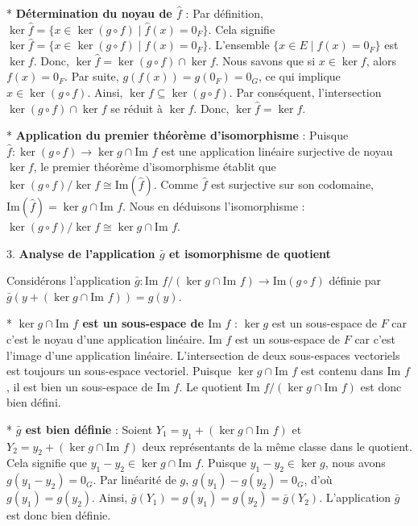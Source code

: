 \documentclass{report}
\begin{document}
    *   \textbf{Détermination du noyau de $\hat{f}$} :
        Par définition, $\ker \hat{f} = \{x \in \ker(g \circ f) \mid \hat{f}(x) = 0_F\}$.
        Cela signifie $\ker \hat{f} = \{x \in \ker(g \circ f) \mid f(x) = 0_F\}$.
        L'ensemble $\{x \in E \mid f(x) = 0_F\}$ est $\ker f$.
        Donc, $\ker \hat{f} = \ker(g \circ f) \cap \ker f$.
        Nous savons que si $x \in \ker f$, alors $f(x) = 0_F$. Par suite, $g(f(x)) = g(0_F) = 0_G$, ce qui implique $x \in \ker(g \circ f)$.
        Ainsi, $\ker f \subseteq \ker(g \circ f)$.
        Par conséquent, l'intersection $\ker(g \circ f) \cap \ker f$ se réduit à $\ker f$.
        Donc, $\ker \hat{f} = \ker f$.

    *   \textbf{Application du premier théorème d'isomorphisme} :
        Puisque $\hat{f}: \ker(g \circ f) \to \ker g \cap \text{Im } f$ est une application linéaire surjective de noyau $\ker f$, le premier théorème d'isomorphisme établit que
        $\ker(g \circ f) / \ker f \cong \text{Im}(\hat{f})$.
        Comme $\hat{f}$ est surjective sur son codomaine, $\text{Im}(\hat{f}) = \ker g \cap \text{Im } f$.
        Nous en déduisons l'isomorphisme : $\ker(g \circ f) / \ker f \cong \ker g \cap \text{Im } f$.

3.  \textbf{Analyse de l'application $\bar{g}$ et isomorphisme de quotient}

    Considérons l'application $\bar{g}: \text{Im } f / (\ker g \cap \text{Im } f) \to \text{Im}(g \circ f)$ définie par $\bar{g}(y + (\ker g \cap \text{Im } f)) = g(y)$.

    *   \textbf{$\ker g \cap \text{Im } f$ est un sous-espace de $\text{Im } f$} :
        $\ker g$ est un sous-espace de $F$ car c'est le noyau d'une application linéaire.
        $\text{Im } f$ est un sous-espace de $F$ car c'est l'image d'une application linéaire.
        L'intersection de deux sous-espaces vectoriels est toujours un sous-espace vectoriel.
        Puisque $\ker g \cap \text{Im } f$ est contenu dans $\text{Im } f$, il est bien un sous-espace de $\text{Im } f$.
        Le quotient $\text{Im } f / (\ker g \cap \text{Im } f)$ est donc bien défini.

    *   \textbf{$\bar{g}$ est bien définie} :
        Soient $Y_1 = y_1 + (\ker g \cap \text{Im } f)$ et $Y_2 = y_2 + (\ker g \cap \text{Im } f)$ deux représentants de la même classe dans le quotient.
        Cela signifie que $y_1 - y_2 \in \ker g \cap \text{Im } f$.
        Puisque $y_1 - y_2 \in \ker g$, nous avons $g(y_1 - y_2) = 0_G$.
        Par linéarité de $g$, $g(y_1) - g(y_2) = 0_G$, d'où $g(y_1) = g(y_2)$.
        Ainsi, $\bar{g}(Y_1) = g(y_1) = g(y_2) = \bar{g}(Y_2)$. L'application $\bar{g}$ est donc bien définie.
\end{document}
